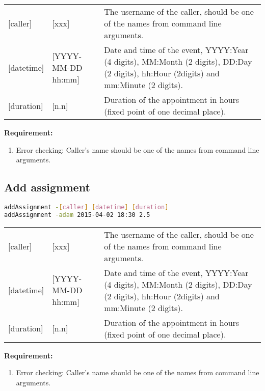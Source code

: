 \documentclass[12pt,a4paper]{report}
\begin{document}
\begin{table}[h]
\begin{tabular}{lll}
{[}caller{]} & {[}xxx{]} & The username of the caller, should be one of the names from command line arguments. \\
{[}datetime{]} & {[}YYYY-MM-DD hh:mm{]} & \parbox[t]{15cm}{Date and time of the event, YYYY:Year (4 digits), MM:Month (2 digits), DD:Day (2 digits), hh:Hour (2digits) and mm:Minute (2 digits).} \\
{[}duration{]}  & {[}n.n{]} & Duration of the appointment in hours (fixed point of one decimal place).
\end{tabular}
\end{table}

\textbf{Requirement:}
\begin{enumerate}
\item Error checking: Caller's name should be one of the names from command line arguments.
\end{enumerate}

\subsection{Add assignment}
\begin{lstlisting}[language=bash,basicstyle=\ttfamily,keywordstyle=\bfseries]
addAssignment -[caller] [datetime] [duration]
addAssignment -adam 2015-04-02 18:30 2.5
\end{lstlisting}

\begin{table}[h]
\begin{tabular}{lll}
{[}caller{]} & {[}xxx{]} & The username of the caller, should be one of the names from command line arguments. \\
{[}datetime{]} & {[}YYYY-MM-DD hh:mm{]} & \parbox[t]{15cm}{Date and time of the event, YYYY:Year (4 digits), MM:Month (2 digits), DD:Day (2 digits), hh:Hour (2digits) and mm:Minute (2 digits).} \\
{[}duration{]}  & {[}n.n{]} & Duration of the appointment in hours (fixed point of one decimal place).
\end{tabular}
\end{table}

\textbf{Requirement:}
\begin{enumerate}
\item Error checking: Caller's name should be one of the names from command line arguments.
\end{enumerate}
\end{document}

